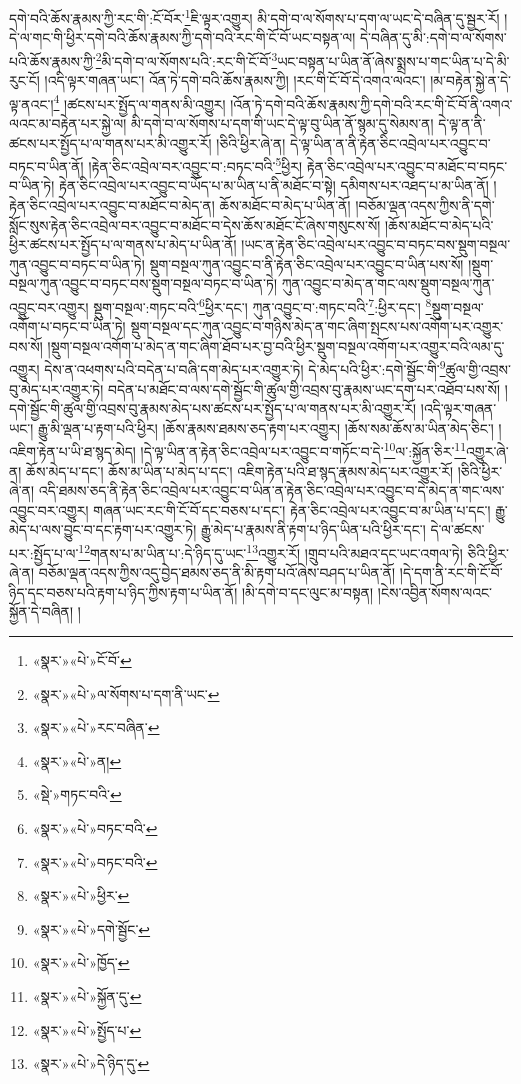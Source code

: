དགེ་བའི་ཆོས་རྣམས་ཀྱི་རང་གི་:ངོ་བོར་\footnote{«སྣར་»«པེ་»ངོ་བོ་}ཇི་ལྟར་འགྱུར། མི་དགེ་བ་ལ་སོགས་པ་དག་ལ་ཡང་དེ་བཞིན་དུ་སྦྱར་རོ། །དེ་ལ་གང་གི་ཕྱིར་དགེ་བའི་ཆོས་རྣམས་ཀྱི་དགེ་བའི་རང་གི་ངོ་བོ་ཡང་བསྟན་ལ། དེ་བཞིན་དུ་མི་:དགེ་བ་ལ་སོགས་པའི་ཆོས་རྣམས་ཀྱི་\footnote{«སྣར་»«པེ་»ལ་སོགས་པ་དག་ནི་ཡང་}མི་དགེ་བ་ལ་སོགས་པའི་:རང་གི་ངོ་བོ་\footnote{«སྣར་»«པེ་»རང་བཞིན་}ཡང་བསྟན་པ་ཡིན་ནོ་ཞེས་སྨྲས་པ་གང་ཡིན་པ་དེ་མི་རུང་ངོ། །འདི་ལྟར་གཞན་ཡང་། འོན་ཏེ་དགེ་བའི་ཆོས་རྣམས་ཀྱི། །རང་གི་ངོ་བོ་དེ་འགའ་ལའང་། །མ་བརྟེན་སྐྱེ་ན་དེ་ལྟ་ནའང་།\footnote{«སྣར་»«པེ་»ན།} །ཚངས་པར་སྤྱོད་ལ་གནས་མི་འགྱུར། །འོན་ཏེ་དགེ་བའི་ཆོས་རྣམས་ཀྱི་དགེ་བའི་རང་གི་ངོ་བོ་ནི་འགའ་ལའང་མ་བརྟེན་པར་སྐྱེ་ལ། མི་དགེ་བ་ལ་སོགས་པ་དག་གི་ཡང་དེ་ལྟ་བུ་ཡིན་ནོ་སྙམ་དུ་སེམས་ན། དེ་ལྟ་ན་ནི་ཚངས་པར་སྤྱོད་པ་ལ་གནས་པར་མི་འགྱུར་རོ། །ཅིའི་ཕྱིར་ཞེ་ན། དེ་ལྟ་ཡིན་ན་ནི་རྟེན་ཅིང་འབྲེལ་པར་འབྱུང་བ་བཏང་བ་ཡིན་ནོ། །རྟེན་ཅིང་འབྲེལ་བར་འབྱུང་བ་:བཏང་བའི་\footnote{«སྡེ་»གཏང་བའི་}ཕྱིར། རྟེན་ཅིང་འབྲེལ་པར་འབྱུང་བ་མཐོང་བ་བཏང་བ་ཡིན་ཏེ། རྟེན་ཅིང་འབྲེལ་པར་འབྱུང་བ་ཡོད་པ་མ་ཡིན་པ་ནི་མཐོང་བ་སྟེ། དམིགས་པར་འཐད་པ་མ་ཡིན་ནོ། །རྟེན་ཅིང་འབྲེལ་པར་འབྱུང་བ་མཐོང་བ་མེད་ན། ཆོས་མཐོང་བ་མེད་པ་ཡིན་ནོ། །བཅོམ་ལྡན་འདས་ཀྱིས་ནི་དགེ་སློང་སུས་རྟེན་ཅིང་འབྲེལ་བར་འབྱུང་བ་མཐོང་བ་དེས་ཆོས་མཐོང་ངོ་ཞེས་གསུངས་སོ། །ཆོས་མཐོང་བ་མེད་པའི་ཕྱིར་ཚངས་པར་སྤྱོད་པ་ལ་གནས་པ་མེད་པ་ཡིན་ནོ། །ཡང་ན་རྟེན་ཅིང་འབྲེལ་པར་འབྱུང་བ་བཏང་བས་སྡུག་བསྔལ་ཀུན་འབྱུང་བ་བཏང་བ་ཡིན་ཏེ། སྡུག་བསྔལ་ཀུན་འབྱུང་བ་ནི་རྟེན་ཅིང་འབྲེལ་པར་འབྱུང་བ་ཡིན་པས་སོ། །སྡུག་བསྔལ་ཀུན་འབྱུང་བ་བཏང་བས་སྡུག་བསྔལ་བཏང་བ་ཡིན་ཏེ། ཀུན་འབྱུང་བ་མེད་ན་གང་ལས་སྡུག་བསྔལ་ཀུན་འབྱུང་བར་འགྱུར། སྡུག་བསྔལ་:གཏང་བའི་\footnote{«སྣར་»«པེ་»བཏང་བའི་}ཕྱིར་དང་། ཀུན་འབྱུང་བ་:གཏང་བའི་\footnote{«སྣར་»«པེ་»བཏང་བའི་}:ཕྱིར་དང་། \footnote{«སྣར་»«པེ་»ཕྱིར་}སྡུག་བསྔལ་འགོག་པ་བཏང་བ་ཡིན་ཏེ། སྡུག་བསྔལ་དང་ཀུན་འབྱུང་བ་གཉིས་མེད་ན་གང་ཞིག་སྤངས་པས་འགོག་པར་འགྱུར་བས་སོ། །སྡུག་བསྔལ་འགོག་པ་མེད་ན་གང་ཞིག་ཐོབ་པར་བྱ་བའི་ཕྱིར་སྡུག་བསྔལ་འགོག་པར་འགྱུར་བའི་ལམ་དུ་འགྱུར། དེས་ན་འཕགས་པའི་བདེན་པ་བཞི་དག་མེད་པར་འགྱུར་ཏེ། དེ་མེད་པའི་ཕྱིར་:དགེ་སྦྱོང་གི་\footnote{«སྣར་»«པེ་»དགེ་སྦྱོང་}ཚུལ་གྱི་འབྲས་བུ་མེད་པར་འགྱུར་ཏེ། བདེན་པ་མཐོང་བ་ལས་དགེ་སྦྱོང་གི་ཚུལ་གྱི་འབྲས་བུ་རྣམས་ཡང་དག་པར་འཐོབ་པས་སོ། །དགེ་སྦྱོང་གི་ཚུལ་གྱི་འབྲས་བུ་རྣམས་མེད་པས་ཚངས་པར་སྤྱོད་པ་ལ་གནས་པར་མི་འགྱུར་རོ། །འདི་ལྟར་གཞན་ཡང་། རྒྱུ་མི་ལྡན་པ་རྟག་པའི་ཕྱིར། །ཆོས་རྣམས་ཐམས་ཅད་རྟག་པར་འགྱུར། །ཆོས་སམ་ཆོས་མ་ཡིན་མེད་ཅིང་། །འཇིག་རྟེན་པ་ཡི་ཐ་སྙད་མེད། །དེ་ལྟ་ཡིན་ན་རྟེན་ཅིང་འབྲེལ་པར་འབྱུང་བ་གཏོང་བ་དེ་\footnote{«སྣར་»«པེ་»ཁྱོད་}ལ་:སྐྱོན་ཅིར་\footnote{«སྣར་»«པེ་»སྐྱོན་དུ་}འགྱུར་ཞེ་ན། ཆོས་མེད་པ་དང་། ཆོས་མ་ཡིན་པ་མེད་པ་དང་། འཇིག་རྟེན་པའི་ཐ་སྙད་རྣམས་མེད་པར་འགྱུར་རོ། །ཅིའི་ཕྱིར་ཞེ་ན། འདི་ཐམས་ཅད་ནི་རྟེན་ཅིང་འབྲེལ་པར་འབྱུང་བ་ཡིན་ན་རྟེན་ཅིང་འབྲེལ་པར་འབྱུང་བ་དེ་མེད་ན་གང་ལས་འབྱུང་བར་འགྱུར། གཞན་ཡང་རང་གི་ངོ་བོ་དང་བཅས་པ་དང་། རྟེན་ཅིང་འབྲེལ་པར་འབྱུང་བ་མ་ཡིན་པ་དང་། རྒྱུ་མེད་པ་ལས་བྱུང་བ་དང་རྟག་པར་འགྱུར་ཏེ། རྒྱུ་མེད་པ་རྣམས་ནི་རྟག་པ་ཉིད་ཡིན་པའི་ཕྱིར་དང་། དེ་ལ་ཚངས་པར་:སྤྱོད་པ་ལ་\footnote{«སྣར་»«པེ་»སྤྱོད་པ་}གནས་པ་མ་ཡིན་པ་:དེ་ཉིད་དུ་ཡང་\footnote{«སྣར་»«པེ་»དེ་ཉིད་དུ་}འགྱུར་རོ། །གྲུབ་པའི་མཐའ་དང་ཡང་འགལ་ཏེ། ཅིའི་ཕྱིར་ཞེ་ན། བཅོམ་ལྡན་འདས་ཀྱིས་འདུ་བྱེད་ཐམས་ཅད་ནི་མི་རྟག་པའོ་ཞེས་བཤད་པ་ཡིན་ནོ། །དེ་དག་ནི་རང་གི་ངོ་བོ་ཉིད་དང་བཅས་པའི་རྟག་པ་ཉིད་ཀྱིས་རྟག་པ་ཡིན་ནོ། །མི་དགེ་བ་དང་ལུང་མ་བསྟན། །ངེས་འབྱིན་སོགས་ལའང་སྐྱོན་དེ་བཞིན། །
